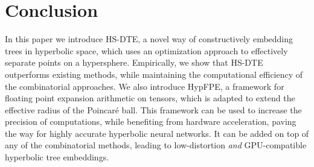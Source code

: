 \section{Conclusion}
\label{sec:conclusion}
\vspace{-0.15cm}
In this paper we introduce HS-DTE, a novel way of constructively embedding trees in hyperbolic space, which uses an optimization approach to effectively separate points on a hypersphere. Empirically, we show that HS-DTE outperforms existing methods, while maintaining the computational efficiency of the combinatorial approaches. We also introduce HypFPE, a framework for floating point expansion arithmetic on tensors, which is adapted to extend the effective radius of the Poincaré ball. This framework can be used to increase the precision of computations, while benefiting from hardware acceleration, paving the way for highly accurate hyperbolic neural networks. It can be added on top of any of the combinatorial methods, leading to low-distortion \emph{and} GPU-compatible hyperbolic tree embeddings.
